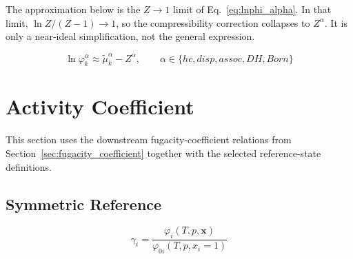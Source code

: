 \documentclass[12pt, letterpaper]{article}
\begin{document}

The approximation below is the \(Z\to 1\) limit of Eq.~\eqref{eq:lnphi_alpha}. In that limit, \(\ln Z/(Z-1)\to 1\), so the compressibility correction collapses to \(Z^\alpha\). It is only a near-ideal simplification, not the general expression.

\begin{equation}
    \ln\varphi_{k}^{\alpha}
    \approx
    \tilde{\mu}_{k}^{\alpha}
    -
    Z^{\alpha},
    \qquad
    \alpha\in\{hc,disp,assoc,DH,Born\}
    \label{eq:lnphi_alpha_near_ideal}
\end{equation}

\section{Activity Coefficient}
\label{sec:activity_coefficient}

This section uses the downstream fugacity-coefficient relations from Section~\ref{sec:fugacity_coefficient} together with the selected reference-state definitions.

\subsection{Symmetric Reference}


\begin{equation}
    \gamma_{i}
    =
    \frac{\varphi_{i}(T,p,\mathbf{x})}{\varphi_{0i}(T,p,x_{i}=1)}
    \label{eq:gamma_sym}
\end{equation}

\end{document}
